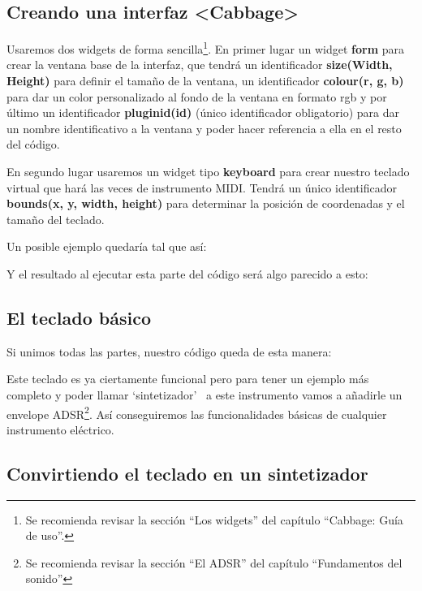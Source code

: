 \subsection{Creando una interfaz \textless Cabbage\textgreater}\label{sec:UISinte}

Usaremos dos widgets de forma sencilla\footnote{Se recomienda revisar la sección ``Los widgets'' del capítulo ``Cabbage: Guía de uso''.}. En primer lugar un widget \textbf{form} para crear la ventana base de la interfaz, que tendrá un identificador \textbf{size(Width, Height)} para definir el tamaño de la ventana, un identificador \textbf{colour(r, g, b)} para dar un color personalizado al fondo de la ventana en formato rgb y por último un identificador \textbf{pluginid(id)} (único identificador obligatorio) para dar un nombre identificativo a la ventana y poder hacer referencia a ella en el resto del código.

En segundo lugar usaremos un widget tipo \textbf{keyboard} para crear nuestro teclado virtual que hará las veces de instrumento MIDI. Tendrá un único identificador \textbf{bounds(x, y, width, height)} para determinar la posición de coordenadas y el tamaño del teclado.

Un posible ejemplo quedaría tal que así:

Y el resultado al ejecutar esta parte del código será algo parecido a esto:

\pagebreak 
\subsection{El teclado básico}\label{sec:SinteBasico}

Si unimos todas las partes, nuestro código queda de esta manera:


Este teclado es ya ciertamente funcional pero para tener un ejemplo más completo y poder llamar `sintetizador' \ a este instrumento vamos a añadirle un envelope ADSR\footnote{Se recomienda revisar la sección ``El ADSR'' del capítulo ``Fundamentos del sonido''}. Así conseguiremos las funcionalidades básicas de cualquier instrumento eléctrico.

\subsection{Convirtiendo el teclado en un sintetizador}\label{sec:SinteReal}

